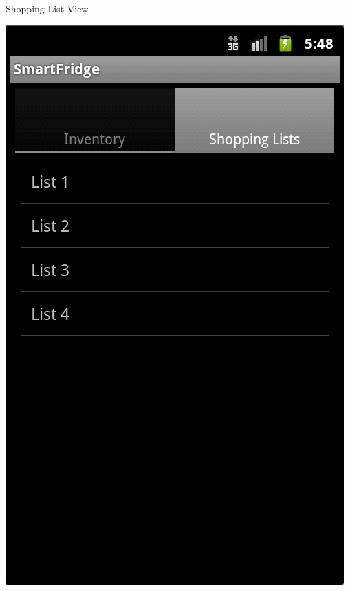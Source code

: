 \documentclass[t]{beamer}
\begin{document}
\begin{frame}{Shopping List View}
    \begin{center}
        \includegraphics[scale=0.4]{../Graphics/ShoppingLists.PNG}
    \end{center}
\end{frame}
\end{document}
